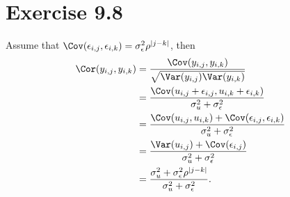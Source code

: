 \section*{Exercise 9.8}
Assume that $\Cov(\epsilon_{i,j},\epsilon_{i,k}) = \sigma_{\epsilon}^{2}\rho^{|j-k|}$, then
\begin{align*}
\Cor(y_{i,j},y_{i,k}) &= \frac{\Cov(y_{i,j},y_{i,k})}{\sqrt{\Var(y_{i,j})\Var(y_{i,k})}}\\
&= \frac{\Cov(u_{i,j} + \epsilon_{i,j}, u_{i,k}+\epsilon_{i,k})}{\sigma_{u}^{2}+\sigma_{\epsilon}^{2}}\\
&= \frac{\Cov(u_{i,j}, u_{i,k}) + \Cov(\epsilon_{i,j}, \epsilon_{i,k})}{\sigma_{u}^{2}+\sigma_{\epsilon}^{2}}\\
&= \frac{\Var(u_{i,j}) + \Cov(\epsilon_{i,j})}{\sigma_{u}^{2}+\sigma_{\epsilon}^{2}}\\
&= \frac{\sigma_{u}^{2} + \sigma_{\epsilon}^{2}\rho^{|j-k|}}{\sigma_{u}^{2}+\sigma_{\epsilon}^{2}}.
\end{align*}